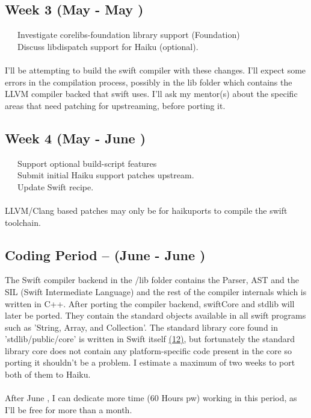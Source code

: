 \documentclass[12pt]{article}
\begin{document}
\subsection*{Week 3 (May  - May )}

\textbullet \ \ \ Investigate corelibs-foundation library support (Foundation)\\
\textbullet \ \ \ Discuss libdispatch support for Haiku (optional).
\\\\
I'll be attempting to build the swift compiler with these changes. I'll expect some errors in the compilation process, possibly in the lib folder which contains the LLVM compiler backed that swift uses. I'll ask my mentor(s) about the specific areas that need patching for upstreaming, before porting it.

\subsection*{Week 4 (May  - June )}
\textbullet \ \ \ Support optional build-script features\\
\textbullet \ \ \ Submit initial Haiku support patches upstream.\\
\textbullet \ \ \ Update Swift recipe. \\
\\
LLVM/Clang based patches may only be for haikuports to compile the swift toolchain.

\subsection*{ Coding Period -- (June  - June )}
The Swift compiler backend in the /lib folder contains the Parser, AST and the SIL (Swift Intermediate Language) and the rest of the compiler internals which is written in C++. After porting the compiler backend, swiftCore and stdlib will later be ported. They contain the standard objects available in all swift programs such as 'String, Array, and Collection'. The standard library core found in 'stdlib/public/core' is written in Swift itself \hyperlink{(12)}{(12)}, but fortunately the standard library core does not contain any platform-specific code present in the core so porting it shouldn't be a problem. I estimate a maximum of two weeks to port both of them to Haiku.
\\\\
After June , I can dedicate more time (60 Hours pw) working in this period, as I'll be free for more than a month.
\end{document}
